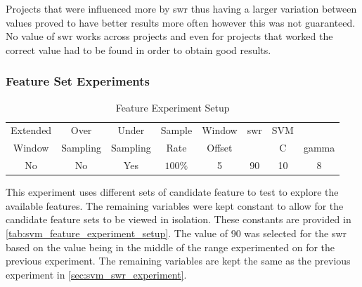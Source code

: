 Projects that were influenced more by \gls{swr} thus having a larger variation between values proved to have better results more often however this was not guaranteed. No value of \gls{swr} works across projects and even for projects that worked the correct value had to be found in order to obtain good results.

    
\subsubsection{Feature Set Experiments}
\label{sec:svm_feature_set_experiments}


\begin{table}[h]
\begin{center}

    \begin{tabular}{|c|c|c|c|c|c|cc|}
        \hline
        Extended & Over & Under & Sample & Window & \gls{swr} & SVM & \\
        Window & Sampling & Sampling & Rate & Offset &  & C & gamma \\ \hline
        No & No & Yes & $100\%$ & 5 & 90 & 10 & 8 \\ \hline
    \end{tabular}
    \caption{Feature Experiment Setup}
    \label{tab:svm_feature_experiment_setup}
\end{center}

\end{table}



This experiment uses different sets of candidate feature to test to explore the available features. The remaining variables were kept constant to allow for the candidate feature sets to be viewed in isolation. These constants are provided in \autoref{tab:svm_feature_experiment_setup}. The value of $90$ was selected for the \gls{swr} based on the value being in the middle of the range experimented on for the previous experiment. The remaining variables are kept the same as the previous experiment in \autoref{sec:svm_swr_experiment}. 

